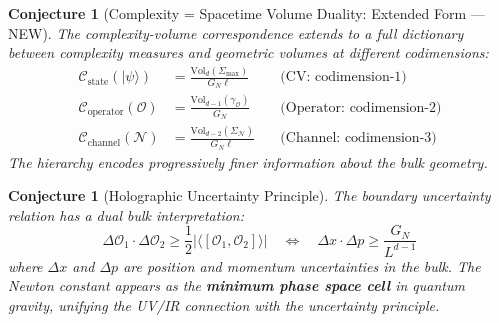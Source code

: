 \documentclass[12pt,a4paper]{article}
\newtheorem{conjecture}[theorem]{Conjecture}
\begin{document}
\begin{conjecture}[Complexity = Spacetime Volume Duality: Extended Form --- NEW]
The complexity-volume correspondence extends to a full dictionary between complexity measures and geometric volumes at different codimensions:
\begin{equation}
\begin{aligned}
\mathcal{C}_{\text{state}}(|\psi\rangle) &= \frac{\text{Vol}_{d}(\Sigma_{\max})}{G_N \ell} \quad &\text{(CV: codimension-1)} \\
\mathcal{C}_{\text{operator}}(\mathcal{O}) &= \frac{\text{Vol}_{d-1}(\gamma_{\mathcal{O}})}{G_N} \quad &\text{(Operator: codimension-2)} \\
\mathcal{C}_{\text{channel}}(\mathcal{N}) &= \frac{\text{Vol}_{d-2}(\Sigma_{\mathcal{N}})}{G_N \ell} \quad &\text{(Channel: codimension-3)}
\end{aligned}
\end{equation}
The hierarchy encodes progressively finer information about the bulk geometry.
\end{conjecture}

\begin{conjecture}[Holographic Uncertainty Principle]
The boundary uncertainty relation has a dual bulk interpretation:
\begin{equation}
\Delta \mathcal{O}_1 \cdot \Delta \mathcal{O}_2 \geq \frac{1}{2}|\langle [\mathcal{O}_1, \mathcal{O}_2] \rangle| \quad \Longleftrightarrow \quad \Delta x \cdot \Delta p \geq \frac{G_N}{L^{d-1}}
\end{equation}
where $\Delta x$ and $\Delta p$ are position and momentum uncertainties in the bulk. The Newton constant appears as the \textbf{minimum phase space cell} in quantum gravity, unifying the UV/IR connection with the uncertainty principle.
\end{conjecture}
\end{document}
